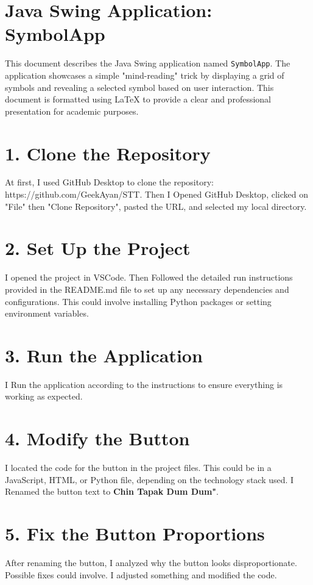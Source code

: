 \documentclass[12pt, a4paper]{article}
\begin{document}
\section*{Java Swing Application: SymbolApp}
This document describes the Java Swing application named \texttt{SymbolApp}. The application showcases a simple "mind-reading" trick by displaying a grid of symbols and revealing a selected symbol based on user interaction. This document is formatted using LaTeX to provide a clear and professional presentation for academic purposes.

\section*{ 1. Clone the Repository}
At first, I used GitHub Desktop to clone the repository: https://github.com/GeekAyan/STT.
Then I Opened GitHub Desktop, clicked on "File" then "Clone Repository", pasted the URL, and selected my local directory.

\section*{  2. Set Up the Project}
I opened the project in VSCode.
Then Followed the detailed run instructions provided in the README.md file to set up any necessary dependencies and configurations. This could involve installing Python packages or setting environment variables.

\section*{ 3. Run the Application}
I Run the application according to the instructions to ensure everything is working as expected.

\section*{ 4. Modify the Button}
I located the code for the button in the project files. This could be in a JavaScript, HTML, or Python file, depending on the technology stack used.
I Renamed the button text to \textbf{Chin Tapak Dum Dum"}.
  
\section*{ 5. Fix the Button Proportions}
After renaming the button, I analyzed why the button looks disproportionate. Possible fixes could involve. I adjusted something and modified the code.
\end{document}
